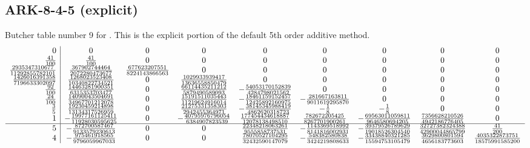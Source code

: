 \documentclass[letterpaper,10pt,english]{sphinxmanual}
\begin{document}
\subsection{ARK-8-4-5 (explicit)}
\label{Butcher:butcher-ark-8-4-5-e}\label{Butcher:ark-8-4-5-explicit}
Butcher table number 9
for {\hyperref[c_interface/User_callable:ARKodeSetERKTableNum]{}}.  This is
the explicit portion of the default 5th order additive method.
\begin{gather}
\begin{split}\begin{array}{r|cccccccc}
  0 & 0 & 0 & 0 & 0 & 0 & 0 & 0 & 0 \\
  \frac{41}{100} & \frac{41}{100} & 0 & 0 & 0 & 0 & 0 & 0 & 0 \\
  \frac{2935347310677}{11292855782101} & \frac{367902744464}{2072280473677} & \frac{677623207551}{8224143866563} & 0 & 0 & 0 & 0 & 0 & 0 \\
  \frac{1426016391358}{7196633302097} & \frac{1268023523408}{10340822734521} & 0 & \frac{1029933939417}{13636558850479} & 0 & 0 & 0 & 0 & 0 \\
  \frac{92}{100} & \frac{14463281900351}{6315353703477} & 0 & \frac{66114435211212}{5879490589093} & -\frac{54053170152839}{4284798021562} & 0 & 0 & 0 & 0 \\
  \frac{24}{100} & \frac{14090043504691}{34967701212078} & 0 & \frac{15191511035443}{11219624916014} & -\frac{18461159152457}{12425892160975} & -\frac{281667163811}{9011619295870} & 0 & 0 & 0 \\
  \frac{3}{5} & \frac{19230459214898}{13134317526959} & 0 & \frac{21275331358303}{2942455364971} & -\frac{38145345988419}{4862620318723} & -\frac{1}{8} & -\frac{1}{8} & 0 & 0 \\
  1 & -\frac{19977161125411}{11928030595625} & 0 & -\frac{40795976796054}{6384907823539} & \frac{177454434618887}{12078138498510} & \frac{782672205425}{8267701900261} & -\frac{69563011059811}{9646580694205} & \frac{7356628210526}{4942186776405} & 0 \\
  \hline
  5 & -\frac{872700587467}{9133579230613} & 0 & 0 & \frac{22348218063261}{9555858737531} & -\frac{1143369518992}{8141816002931} & -\frac{39379526789629}{19018526304540} & \frac{32727382324388}{42900044865799} & \frac{41}{200} \\
  4 & -\frac{975461918565}{9796059967033} & 0 & 0 & \frac{78070527104295}{32432590147079} & -\frac{548382580838}{3424219808633} & -\frac{33438840321285}{15594753105479} & \frac{3629800801594}{4656183773603} & \frac{4035322873751}{18575991585200}
\end{array}\end{split}\notag
\end{gather}\begin{figure}[htbp]
\centering
\capstart


\end{figure}
\end{document}
